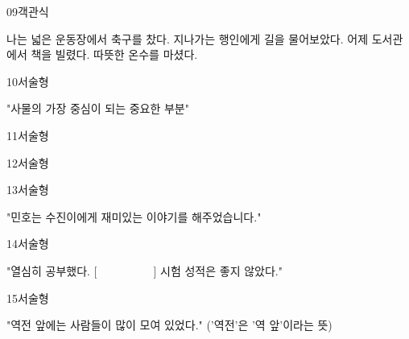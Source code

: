\documentclass[fs11,seriesFre]{korfarm-base}
\begin{document}
\begin{kfQBlock}{09}{객관식}
\begin{kfChoices}
\kfChoice 나는 넓은 운동장에서 축구를 찼다.
\kfChoice 지나가는 행인에게 길을 물어보았다.
\kfChoice 어제 도서관에서 책을 빌렸다.
\kfChoice 따뜻한 온수를 마셨다.
\end{kfChoices}
\end{kfQBlock}

\begin{kfQBlock}{10}{서술형}
\begin{kfEvidence}"사물의 가장 중심이 되는 중요한 부분"\end{kfEvidence}
\end{kfQBlock}

\begin{kfQBlock}{11}{서술형}
\end{kfQBlock}

\begin{kfQBlock}{12}{서술형}
\end{kfQBlock}

\begin{kfQBlock}{13}{서술형}
\begin{kfEvidence}"민호는 수진이에게 재미있는 이야기를 해주었습니다."\end{kfEvidence}
\end{kfQBlock}

\begin{kfQBlock}{14}{서술형}
\begin{kfEvidence}"열심히 공부했다. [　　　　　] 시험 성적은 좋지 않았다."\end{kfEvidence}
\end{kfQBlock}

\begin{kfQBlock}{15}{서술형}
\begin{kfEvidence}"역전 앞에는 사람들이 많이 모여 있었다." ('역전'은 '역 앞'이라는 뜻)\end{kfEvidence}
\end{kfQBlock}
\end{document}
